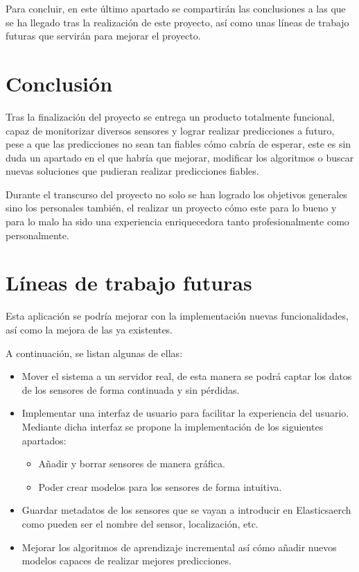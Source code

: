 
Para concluir, en este último apartado se compartirán las conclusiones a las que se ha llegado tras la realización de este proyecto, así como unas líneas de trabajo futuras que servirán para mejorar el proyecto.

\section{Conclusión}

Tras la finalización del proyecto se entrega un producto totalmente funcional, capaz de monitorizar diversos sensores y lograr realizar predicciones a futuro, pese a que las predicciones no sean tan fiables cómo cabría de esperar, este es sin duda un apartado en el que habría que mejorar, modificar los algoritmos o buscar nuevas soluciones que pudieran realizar predicciones fiables.

Durante el transcurso del proyecto no solo se han logrado los objetivos generales sino los personales también, el realizar un proyecto cómo este para lo bueno y para lo malo ha sido una experiencia enriquecedora tanto profesionalmente como personalmente.


\section{Líneas de trabajo futuras}
Esta aplicación se podría mejorar con la implementación nuevas funcionalidades, así como la mejora de las ya existentes.

A continuación, se listan algunas de ellas:
\begin{itemize}
    \item Mover el sistema a un servidor real, de esta manera se podrá captar los datos de los sensores de forma continuada y sin pérdidas.
    \item Implementar una interfaz de usuario para facilitar la experiencia del usuario. Mediante dicha interfaz se propone la implementación de los siguientes apartados:
    \begin{itemize}
        \item Añadir y borrar sensores de manera gráfica.
        \item Poder crear modelos para los sensores de forma intuitiva.
    \end{itemize}
    \item Guardar metadatos de los sensores que se vayan a introducir en Elasticsaerch como pueden ser el nombre del sensor, localización, etc. 
    \item Mejorar los algoritmos de aprendizaje incremental así cómo añadir nuevos modelos capaces de realizar mejores predicciones.
\end{itemize}